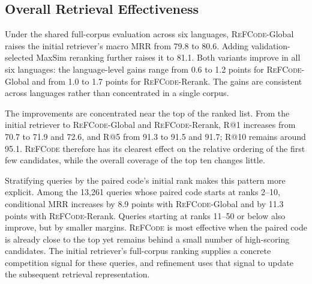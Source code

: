 \documentclass[11pt]{article}
\newcommand{\method}{\textsc{ReFCode}}
\begin{document}
\subsection{Overall Retrieval Effectiveness}
\label{sec:main_results}

Under the shared full-corpus evaluation across six languages, \method{}-Global raises the initial retriever's macro MRR from 79.8 to 80.6. Adding validation-selected MaxSim reranking further raises it to 81.1. Both variants improve in all six languages: the language-level gains range from 0.6 to 1.2 points for \method{}-Global and from 1.0 to 1.7 points for \method{}-Rerank. The gains are consistent across languages rather than concentrated in a single corpus.

The improvements are concentrated near the top of the ranked list. From the initial retriever to \method{}-Global and \method{}-Rerank, R@1 increases from 70.7 to 71.9 and 72.6, and R@5 from 91.3 to 91.5 and 91.7; R@10 remains around 95.1. \method{} therefore has its clearest effect on the relative ordering of the first few candidates, while the overall coverage of the top ten changes little.

Stratifying queries by the paired code's initial rank makes this pattern more explicit. Among the 13,261 queries whose paired code starts at ranks 2--10, conditional MRR increases by 8.9 points with \method{}-Global and by 11.3 points with \method{}-Rerank. Queries starting at ranks 11--50 or below also improve, but by smaller margins. \method{} is most effective when the paired code is already close to the top yet remains behind a small number of high-scoring candidates. The initial retriever's full-corpus ranking supplies a concrete competition signal for these queries, and refinement uses that signal to update the subsequent retrieval representation.
\end{document}
